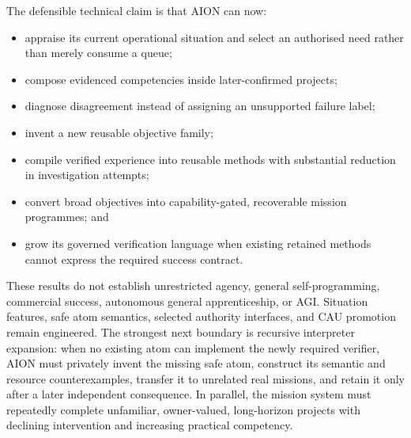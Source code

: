 The defensible technical claim is that AION can now:
\begin{itemize}
    \item appraise its current operational situation and select an authorised
          need rather than merely consume a queue;
    \item compose evidenced competencies inside later-confirmed projects;
    \item diagnose disagreement instead of assigning an unsupported failure
          label;
    \item invent a new reusable objective family;
    \item compile verified experience into reusable methods with substantial
          reduction in investigation attempts;
    \item convert broad objectives into capability-gated, recoverable mission
          programmes; and
    \item grow its governed verification language when existing retained
          methods cannot express the required success contract.
\end{itemize}

These results do not establish unrestricted agency, general self-programming,
commercial success, autonomous general apprenticeship, or AGI.  Situation
features, safe atom semantics, selected authority interfaces, and CAU promotion
remain engineered.  The strongest next boundary is recursive interpreter
expansion: when no existing atom can implement the newly required verifier,
AION must privately invent the missing safe atom, construct its semantic and
resource counterexamples, transfer it to unrelated real missions, and retain it
only after a later independent consequence.  In parallel, the mission system
must repeatedly complete unfamiliar, owner-valued, long-horizon projects with
declining intervention and increasing practical competency.
